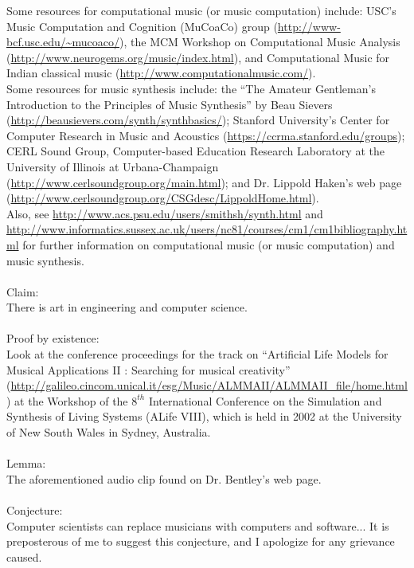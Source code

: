 Some resources for computational music (or music computation) include: USC's Music Computation and Cognition (MuCoaCo) group (\url{http://www-bcf.usc.edu/~mucoaco/}), the MCM Workshop on Computational Music Analysis (\url{http://www.neurogems.org/music/index.html}), and Computational Music for Indian classical music (\url{http://www.computationalmusic.com/}). \\
 
Some resources for music synthesis include: the ``The Amateur Gentleman's Introduction to the Principles of Music Synthesis'' by Beau Sievers (\url{http://beausievers.com/synth/synthbasics/}); Stanford University's Center for Computer Research in Music and Acoustics (\url{https://ccrma.stanford.edu/groups}); CERL Sound Group, Computer-based Education Research Laboratory at the University of Illinois at Urbana-Champaign (\url{http://www.cerlsoundgroup.org/main.html}); and Dr. Lippold Haken's web page (\url{http://www.cerlsoundgroup.org/CSGdesc/LippoldHome.html}). \\
 
Also, see \url{http://www.acs.psu.edu/users/smithsh/synth.html} and \url{http://www.informatics.sussex.ac.uk/users/nc81/courses/cm1/cm1bibliography.html} for further information on computational music (or music computation) and music synthesis. \\


\vspace{1cm}
\ \\
Claim: \\
There is art in engineering and computer science. \\
 \ \\
Proof by existence: \\
Look at the conference proceedings for the track on ``Artificial Life Models for Musical Applications II : Searching for musical creativity'' (\url{http://galileo.cincom.unical.it/esg/Music/ALMMAII/ALMMAII_file/home.html}) at the Workshop of the $8^{th}$ International Conference on the Simulation and Synthesis of Living Systems (ALife VIII), which is held in 2002 at the University of New South Wales in Sydney, Australia. \\
\ \\
Lemma: \\
The aforementioned audio clip found on Dr. Bentley's web page. \\
\ \\
Conjecture: \\
Computer scientists can replace musicians with computers and software... It is preposterous of me to suggest this conjecture, and I apologize for any grievance caused. \\
\vspace{1cm}

